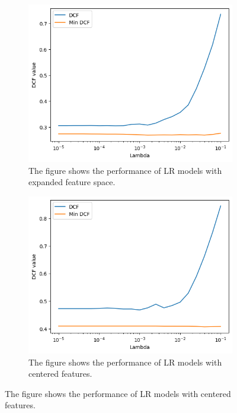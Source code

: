 \documentclass{article}
\begin{document}
\begin{figure}[ht]
    \centering
    \begin{subfigure}[b]{0.45\textwidth}
        \centering
        \includegraphics[width=\textwidth]{images/lr_lambda_quadratic.png}
        \caption{The figure shows the performance of LR models with expanded feature space.}
        \label{fig:lr_lambda_quadratic}
    \end{subfigure}
    \hfill
    \begin{subfigure}[b]{0.45\textwidth}
        \centering
        \includegraphics[width=\textwidth]{images/lr_lambda_centered.png}
        \caption{The figure shows the performance of LR models with centered features.}
        \label{fig:lr_lambda_centered}
    \end{subfigure}
\end{figure}
\end{document}
